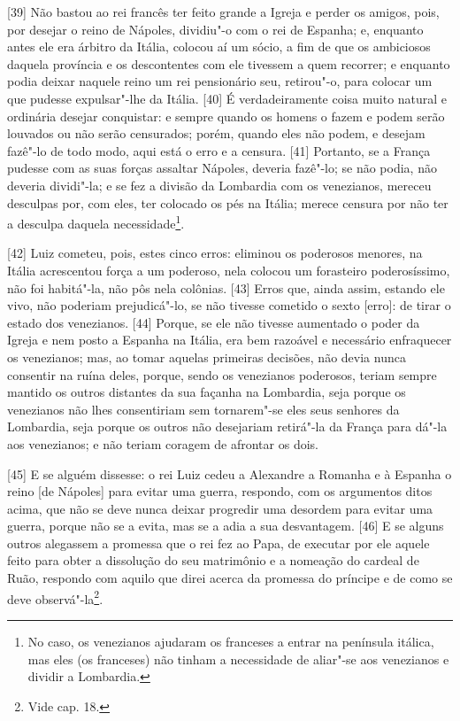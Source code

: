 {[}39{]} Não bastou ao rei francês ter feito grande a Igreja e perder os
amigos, pois, por desejar o reino de Nápoles, dividiu"-o com o rei de
Espanha; e, enquanto antes ele era árbitro da Itália, colocou aí um
sócio, a fim de que os ambiciosos daquela província e os descontentes
com ele tivessem a quem recorrer; e enquanto podia deixar naquele reino
um rei pensionário seu, retirou"-o, para colocar um que pudesse
expulsar"-lhe da Itália. {[}40{]} É verdadeiramente coisa muito natural e
ordinária desejar conquistar: e sempre quando os homens o fazem e podem
serão louvados ou não serão censurados; porém, quando eles não podem, e
desejam fazê"-lo de todo modo, aqui está o erro e a censura. {[}41{]}
Portanto, se a França pudesse com as suas forças assaltar Nápoles,
deveria fazê"-lo; se não podia, não deveria dividi"-la; e se fez a divisão
da Lombardia com os venezianos, mereceu desculpas por, com eles, ter
colocado os pés na Itália; merece censura por não ter a desculpa daquela
necessidade\footnote{No caso, os venezianos ajudaram os franceses a
  entrar na península itálica, mas eles (os franceses) não tinham a
  necessidade de aliar"-se aos venezianos e dividir a Lombardia.}.

{[}42{]} Luiz cometeu, pois, estes cinco erros: eliminou os poderosos
menores, na Itália acrescentou força a um poderoso, nela colocou um
forasteiro poderosíssimo, não foi habitá"-la, não pôs nela colônias.
{[}43{]} Erros que, ainda assim, estando ele vivo, não poderiam
prejudicá"-lo, se não tivesse cometido o sexto {[}erro{]}: de tirar o
estado dos venezianos. {[}44{]} Porque, se ele não tivesse aumentado o
poder da Igreja e nem posto a Espanha na Itália, era bem razoável e
necessário enfraquecer os venezianos; mas, ao tomar aquelas primeiras
decisões, não devia nunca consentir na ruína deles, porque, sendo os
venezianos poderosos, teriam sempre mantido os outros distantes da sua
façanha na Lombardia, seja porque os venezianos não lhes consentiriam
sem tornarem"-se eles seus senhores da Lombardia, seja porque os outros
não desejariam retirá"-la da França para dá"-la aos venezianos; e não
teriam coragem de afrontar os dois.

{[}45{]} E se alguém dissesse: o rei Luiz cedeu a Alexandre a Romanha e
à Espanha o reino {[}de Nápoles{]} para evitar uma guerra, respondo, com
os argumentos ditos acima, que não se deve nunca deixar progredir uma
desordem para evitar uma guerra, porque não se a evita, mas se a adia a
sua desvantagem. {[}46{]} E se alguns outros alegassem a promessa que o
rei fez ao Papa, de executar por ele aquele feito para obter a
dissolução do seu matrimônio e a nomeação do cardeal de Ruão, respondo
com aquilo que direi acerca da promessa do príncipe e de como se deve
observá"-la\footnote{Vide cap. 18.}.

